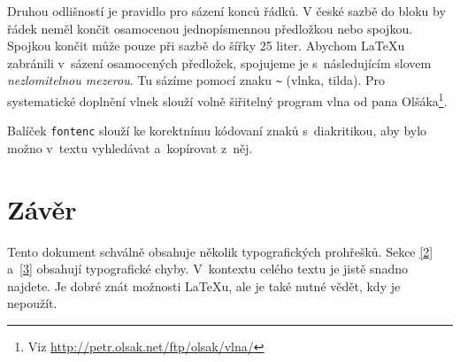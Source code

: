 \documentclass[twocolumn]{article}
\begin{document}
Druhou odlišností je pravidlo pro sázení konců řádků.
V české sazbě do bloku by řádek neměl končit osamocenou jednopísmennou předložkou nebo spojkou.
Spojkou  končit může pouze při sazbě do šířky 25 liter.
Abychom \LaTeX{}u zabránili v~sázení osamocených předložek, spojujeme je s~následujícím slovem \emph{nezlomitelnou mezerou}.
Tu sázíme pomocí znaku \verb|~| (vlnka, tilda).
Pro systematické doplnění vlnek slouží volně šiřitelný program vlna od pana Olšáka\footnote{Viz \url{http://petr.olsak.net/ftp/olsak/vlna/}}.

Balíček \texttt{fontenc} slouží ke korektnímu kódovaní znaků s~diakritikou, aby bylo možno v~textu vyhledávat a~kopírovat z~něj.


\section{Závěr}

Tento dokument schválně obsahuje několik typografických prohřešků.
Sekce \ref{2} a~\ref{3} obsahují typografické chyby.
V~kontextu celého textu je jistě snadno najdete.
Je dobré znát možnosti \LaTeX{}u, ale je také nutné vědět, kdy je nepoužít.
\end{document}

